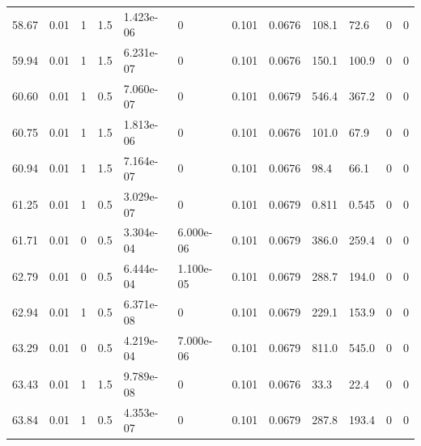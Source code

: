 \documentclass[preview]{standalone}
\begin{document}
{{{{\begin{tabular}{L{1.2cm}C{1.2cm} C{0.3cm}C{0.5cm} C{1.4cm}C{1.4cm} C{1.4cm}C{1.4cm} C{1.6cm}C{1.6cm} C{1.6cm}C{1.6cm}}
  58.67  &  0.01  & 1     & 1.5 &  1.423e-06  & 0  &  0.101&   0.0676& 108.1 & 72.6   &  0 & 0  \\ 
  59.94  &  0.01  & 1     & 1.5 &  6.231e-07  & 0  &  0.101&   0.0676& 150.1 & 100.9   &  0 & 0  \\ 
  60.60  &  0.01  & 1     & 0.5 &  7.060e-07  & 0  &  0.101&   0.0679& 546.4 & 367.2   &  0 & 0  \\ 
  60.75  &  0.01  & 1     & 1.5 &  1.813e-06  & 0  &  0.101&   0.0676& 101.0 & 67.9   &  0 & 0  \\ 
  60.94  &  0.01  & 1     & 1.5 &  7.164e-07  & 0  &  0.101&   0.0676& 98.4 & 66.1   &  0 & 0  \\ 
  61.25  &  0.01  & 1     & 0.5 &  3.029e-07  & 0  &  0.101&   0.0679& 0.811 & 0.545   &  0 & 0  \\ 
  61.71  &  0.01  & 0     & 0.5 &  3.304e-04  & 6.000e-06  &  0.101&   0.0679& 386.0 & 259.4   &  0 & 0  \\ 
  62.79  &  0.01  & 0     & 0.5 &  6.444e-04  & 1.100e-05  &  0.101&   0.0679& 288.7 & 194.0   &  0 & 0  \\ 
  62.94  &  0.01  & 1     & 0.5 &  6.371e-08  & 0  &  0.101&   0.0679& 229.1 & 153.9   &  0 & 0  \\ 
  63.29  &  0.01  & 0     & 0.5 &  4.219e-04  & 7.000e-06  &  0.101&   0.0679& 811.0 & 545.0   &  0 & 0  \\ 
  63.43  &  0.01  & 1     & 1.5 &  9.789e-08  & 0  &  0.101&   0.0676& 33.3 & 22.4   &  0 & 0  \\ 
  63.84  &  0.01  & 1     & 0.5 &  4.353e-07  & 0  &  0.101&   0.0679& 287.8 & 193.4   &  0 & 0  \\ 
\hline 
\end{tabular} 

}}}}
\end{document}
